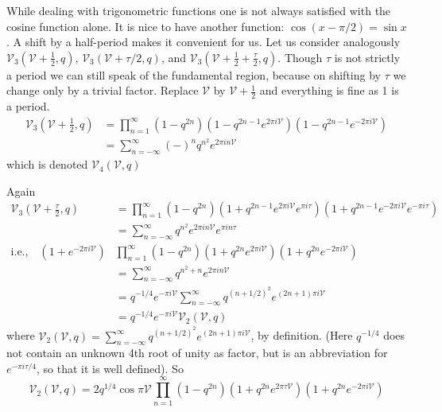 While dealing with trigonometric functions one is not always satisfied
with the cosine function alone. It is nice to have another function:
$\cos (x- \pi/2)= \sin x$. A shift by a half-period makes it
convenient for us. Let us consider analogously
$\mathscr{V}_3(\mathscr{V}+ \frac{1}{2},q)$,
$\mathscr{V}_3(\mathscr{V}+ \tau/2, q)$, and
$\mathscr{V}_3(\mathscr{V}+ \frac{1}{2} + \frac{\tau}{2}, q)$. Though
$\tau$ is not strictly a period we can still speak of the fundamental
region, because on shifting by $\tau$ we change only by a trivial
factor. Replace $\mathscr{V}$ by $\mathscr{V}+\frac{1}{2}$ and
everything is fine as 1 is a period.
\begin{align*}
  \mathscr{V}_3 (\mathscr{V}+ \frac{1}{2}, q) & = \prod^\infty_{n=1}
  (1-q^{2n}) (1-q^{2n-1} e^{2 \pi i \mathscr{V}})(1-q^{2n-1} e^{-2\pi
    i \mathscr{V}})\\
  & = \sum^\infty_{n=-\infty} (-)^n q^{n^2}e^{2 \pi i n \mathscr{V}}
\end{align*}
which is denoted $\mathscr{V}_4(\mathscr{V}, q)$

Again\pageoriginale
\begin{align*}
  \mathscr{V}_3 (\mathscr{V}+ \frac{\tau}{2}, q) & = \prod^\infty_{n=1}
  (1-q^{2n}) (1+q^{2n-1} e^{2 \pi i \mathscr{V}}e^{\pi i \tau})(1+q^{2n-1} e^{-2\pi
    i \mathscr{V}}e^{-\pi i \tau})\\
  & = \sum^\infty_{n=-\infty} q^{n^2} e^{2 \pi i n \mathscr{V}} e^{\pi
  i n \tau}\\
\text{i.e.,} \quad(1+ e^{-2 \pi i \mathscr{V}})
  &\prod\limits^\infty_{n=1} (1- q^{2n}) (1+q^{2n} e^{2 \pi i \mathscr{V}})
  (1+q^{2n} e^{- 2 \pi i \mathscr{V}}) \\
 & = \sum\limits^\infty_{n=- \infty} q^{n^2 + n} e^{2 \pi i n
   \mathscr{V}}\\
 & = q^{-1/4} e^{- \pi i\mathscr{V}} \sum^\infty_{n=-\infty} q^{(n+
  1/2)^2}e^{(2n+1)\pi i \mathscr{V}}\\
 & = q^{-1/4} e^{- \pi i \mathscr{V}} \mathscr{V}_2 (\mathscr{V}, q)
\end{align*}
where $\mathscr{V}_2(\mathscr{V}, q)= \sum\limits^\infty_{n=-\infty}
q^{(n+ 1/2)^2} e^{(2n+1)\pi i \mathscr{V}}$, by definition. (Here
$q^{-1/4}$ does not contain an unknown 4th root of unity as factor,
but is an abbreviation for $e^{- \pi i \tau/4}$, so that it is well
defined). So
$$
\mathscr{V}_2 (\mathscr{V}, q)= 2q^{1/4} \cos \pi \mathscr{V}
\prod^\infty_{n=1} (1- q^{2n})(1+q^{2n} e^{2 \pi \tau \mathscr{V}})(1+ q^{2n}
e^{-2 \pi i \mathscr{V}})
$$

